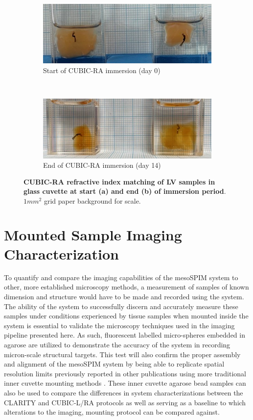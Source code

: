 \begin{figure}[H]
    \centering
    \begin{subfigure}[t]{0.5\textwidth}
        \centering
        \includegraphics[width=0.8\linewidth]{Images/PreRA.jpg}
        \caption{Start of CUBIC-RA immersion (day 0)}
    \end{subfigure}%
    ~ 
    \begin{subfigure}[t]{0.5\textwidth}
        \centering
        \includegraphics[width=0.8\linewidth]{Images/PostRA.jpg}
        \caption{End of CUBIC-RA immersion (day 14)}
    \end{subfigure}
    \caption{\textbf{CUBIC-RA refractive index matching of LV samples in glass cuvette at start (a) and end (b) of immersion period}. $1mm^2$ grid paper background for scale.}
\end{figure}

\section{Mounted Sample Imaging Characterization}

To quantify and compare the imaging capabilities of the mesoSPIM system to other, more established microscopy methods, a measurement of samples of known dimension and structure would have to be made and recorded using the system. The ability of the system to successfully discern and accurately measure these samples under conditions experienced by tissue samples when mounted inside the system is essential to validate the microscopy techniques used in the imaging pipeline presented here. As such, fluorescent labelled micro-spheres embedded in agarose are utilized to demonstrate the accuracy of the system in recording micron-scale structural targets. This test will also confirm the proper assembly and alignment of the mesoSPIM system  by being able to replicate spatial resolution limits previously reported in other publications using more traditional inner cuvette mounting methods \cite{voigt_mesospim_2019}. These inner cuvette agarose bead samples can also be used to compare the differences in system characterizations between the CLARITY and CUBIC-L/RA protocols as well as serving as a baseline to which alterations to the imaging, mounting protocol can be compared against.

